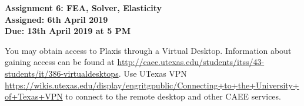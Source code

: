 \documentclass[a4paper,12pt]{article}
\begin{document}
\begin{centering}
	\textbf{
		Assignment 6: FEA, Solver, Elasticity\\
		Assigned: 6th April 2019\\
		Due: 13th April 2019 at 5 PM\\
	}
\end{centering}

\vspace{1em}

You may obtain access to Plaxis through a Virtual Desktop.  Information about gaining access can be found at \url{ http://caee.utexas.edu/students/itss/43-students/it/386-virtualdesktops}. Use UTexas VPN \url{https://wikis.utexas.edu/display/engritgpublic/Connecting+to+the+University+of+Texas+VPN} to connect to the remote desktop and other CAEE services.
\end{document}
